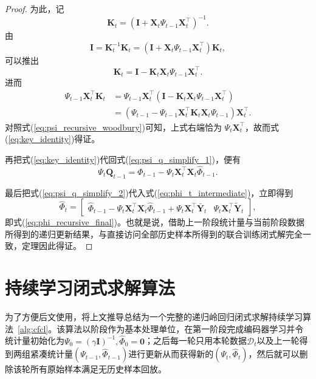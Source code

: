 \begin{proof}
为此，记
\begin{equation}
\mathbf{K}_t=\left(\mathbf{I}+\mathbf{X}_t\Psi_{t-1}\mathbf{X}_t^{\top}\right)^{-1}.
\end{equation}
由
\begin{equation}
\mathbf{I}=\mathbf{K}_t^{-1}\mathbf{K}_t=
\left(\mathbf{I}+\mathbf{X}_t\Psi_{t-1}\mathbf{X}_t^{\top}\right)\mathbf{K}_t,
\end{equation}
可以推出
\begin{equation}
\mathbf{K}_t=\mathbf{I}-\mathbf{K}_t\mathbf{X}_t\Psi_{t-1}\mathbf{X}_t^{\top}.
\end{equation}
进而
\begin{align}
\Psi_{t-1}\mathbf{X}_t^{\top}\mathbf{K}_t
&=\Psi_{t-1}\mathbf{X}_t^{\top}
\left(\mathbf{I}-\mathbf{K}_t\mathbf{X}_t\Psi_{t-1}\mathbf{X}_t^{\top}\right) \\
&=\left(\Psi_{t-1}-\Psi_{t-1}\mathbf{X}_t^{\top}\mathbf{K}_t\mathbf{X}_t\Psi_{t-1}\right)\mathbf{X}_t^{\top}.
\end{align}
对照式(\ref{eq:psi_recursive_woodbury})可知，上式右端恰为 $\Psi_t\mathbf{X}_t^{\top}$，故而式(\ref{eq:key_identity})得证。

再把式(\ref{eq:key_identity})代回式(\ref{eq:psi_q_simplify_1})，便有
\begin{equation}
\Psi_t\mathbf{Q}_{t-1}=\widehat{\Phi}_{t-1}-\Psi_t\mathbf{X}_t^{\top}\mathbf{X}_t\widehat{\Phi}_{t-1}.
\label{eq:psi_q_simplify_2}
\end{equation}

最后把式(\ref{eq:psi_q_simplify_2})代入式(\ref{eq:phi_t_intermediate})，立即得到
\begin{equation}
\widehat{\Phi}_t=
\begin{bmatrix}
\widehat{\Phi}_{t-1}-\Psi_t\mathbf{X}_t^{\top}\mathbf{X}_t\widehat{\Phi}_{t-1}+\Psi_t\mathbf{X}_t^{\top}\bar{\mathbf{Y}}_t
&
\Psi_t\mathbf{X}_t^{\top}\tilde{\mathbf{Y}}_t
\end{bmatrix},
\end{equation}
即式(\ref{eq:phi_recursive_final})。也就是说，借助上一阶段统计量与当前阶段数据所得到的递归更新结果，与直接访问全部历史样本所得到的联合训练闭式解完全一致，定理因此得证。
\end{proof}

\section{持续学习闭式求解算法}

为了方便后文使用，将上文推导总结为一个完整的递归岭回归闭式求解持续学习算法~\ref{alg:cfcl}。该算法以阶段作为基本处理单位，在第一阶段完成编码器学习并令统计量初始化为$\Psi_0=(\gamma\mathbf{I})^{-1},\widehat{\Phi}_0=\mathbf{0}$；之后每一轮只用本轮数据$\mathcal{D}_t$以及上一轮得到两组紧凑统计量$(\Psi_{t-1},\widehat{\Phi}_{t-1})$进行更新从而获得新的$(\Psi_t,\widehat{\Phi}_t)$，然后就可以删除该轮所有原始样本满足无历史样本回放。

